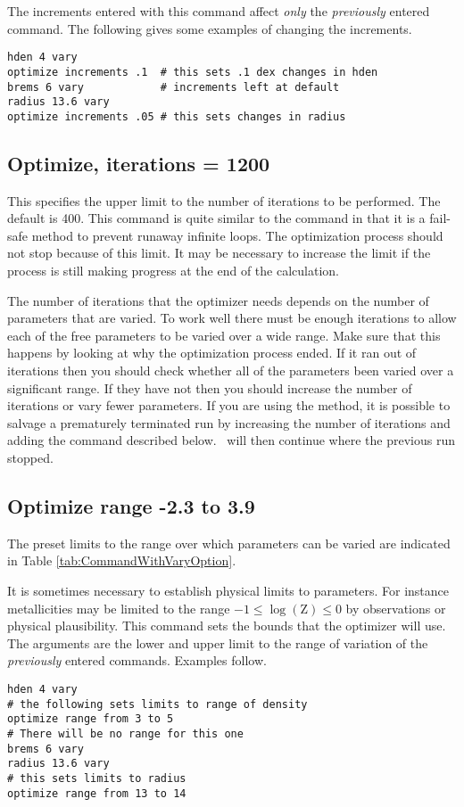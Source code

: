 The increments entered with this command affect
\emph{only} the \emph{previously}
entered  command.
The following gives some examples of changing the
increments.
\begin{verbatim}
hden 4 vary
optimize increments .1  # this sets .1 dex changes in hden
brems 6 vary            # increments left at default
radius 13.6 vary
optimize increments .05 # this sets changes in radius
\end{verbatim}

\subsection{Optimize, iterations = 1200}

This specifies the upper limit to the number of iterations to be
performed.
The default is 400.
This command is quite similar to the
 command in that it is a fail-safe
method to prevent runaway infinite
loops.
The optimization process should not stop because of this limit.
It may be necessary to increase the limit if the process is still making
progress at the end of the calculation.

The number of iterations that the optimizer needs depends on the number
of parameters that are varied.
To work well there must be enough iterations to allow
each of the free parameters to be varied over a wide range.
Make sure that
this happens by looking at why the optimization process ended.
If it ran
out of iterations then you should check whether all of the parameters been
varied over a significant range.
If they have not then you should increase
the number of iterations or vary fewer parameters.
If you are using the  method, it is possible to
salvage a prematurely terminated run by increasing the number of
iterations and adding the  command
described below.
\Cloudy\ will then continue where the previous run stopped.

\subsection{Optimize range -2.3 to 3.9}

The preset limits to the range over which parameters can be varied are
indicated in Table \ref{tab:CommandWithVaryOption}.

It is sometimes necessary to establish physical limits to parameters.
For instance metallicities may be limited to the range
$-1 \le \log(\mathrm{Z}) \le 0$ by
observations or physical plausibility.
This command sets the bounds that
the optimizer will use.
The arguments are the lower and upper limit to
the range of variation of the \emph{previously} entered  commands.
Examples follow.
\begin{verbatim}
hden 4 vary
# the following sets limits to range of density
optimize range from 3 to 5
# There will be no range for this one
brems 6 vary
radius 13.6 vary
# this sets limits to radius
optimize range from 13 to 14
\end{verbatim}

